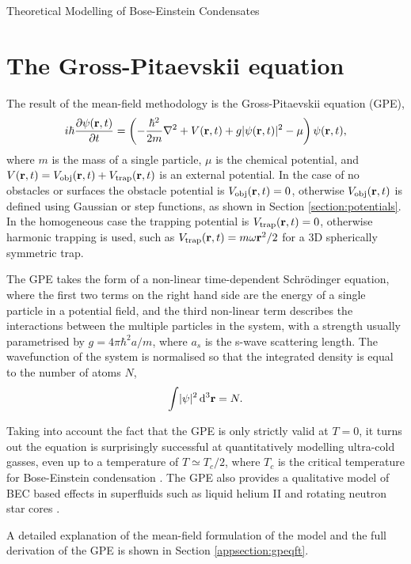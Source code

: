 \begin{chapter}{\label{cha:theoretical_model}Theoretical Modelling of Bose-Einstein Condensates}
\section{\label{section:gpe} The Gross-Pitaevskii equation}
The result of the mean-field methodology is the Gross-Pitaevskii equation (GPE), 
\begin{equation}
i \hbar \frac{\partial\psi({\bf r},t)}{\partial t} = \left(-\frac{\hbar^2}{2m}\nabla^2 + V({\bf r},t) + g|\psi({\bf r},t)|^2 - \mu \right) \psi({\bf r},t),
\label{eq:gpe}
\end{equation}
where $m$ is the mass of a single particle, $\mu$ is the chemical potential, and $V({\bf r},t) = V_{\mathrm{obj}}({\bf r},t) + V_{\mathrm{trap}}({\bf r},t)$ is an external potential. In the case of no obstacles or surfaces the obstacle potential is $V_{\mathrm{obj}}({\bf r},t)=0$, otherwise $V_{\mathrm{obj}}({\bf r},t)$ is defined using Gaussian or step functions, as shown in Section \ref{section:potentials}. In the homogeneous case the trapping potential is $V_{\mathrm{trap}}({\bf r},t)=0$, otherwise harmonic trapping is used, such as $V_{\mathrm{trap}}({\bf r},t)=m\omega{\bf r}^2/2$ for a 3D spherically symmetric trap.

The GPE takes the form of a non-linear time-dependent Schr\"odinger equation, where the first two terms on the right hand side are the energy of a single particle in a potential field, and the third non-linear term describes the interactions between the multiple particles in the system, with a strength usually parametrised by $g=4\pi\hbar^2a/m$,
where $a_s$ is the s-wave scattering length. The wavefunction of the system is normalised so that the integrated density is equal to the number of atoms $N$,
\begin{equation}
\int\!|\psi|^2\,{\rm d}^3{\bf r} = N.
\label{eq:normalisewf}
\end{equation}

Taking into account the fact that the GPE is only strictly valid at $T=0$, it turns out the equation is surprisingly successful at quantitatively modelling ultra-cold gasses, even up to a temperature of $T\simeq T_c/2$, where $T_c$ is the critical temperature for Bose-Einstein condensation \cite{Proukakis}. The GPE also provides a qualitative model of BEC based effects in superfluids such as liquid helium II \cite{RobertsBerloff} and rotating neutron star cores \cite{Warszawski01082011}.

A detailed explanation of the mean-field formulation of the model and the full derivation of the GPE is shown in Section \ref{appsection:gpeqft}.


\end{chapter}
